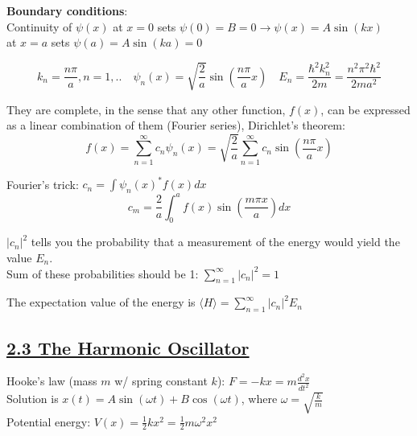 \textbf{Boundary conditions}: \\
Continuity of $\psi(x)$ at $x = 0$ sets $\psi(0) = B = 0 \rightarrow \psi(x) = A \sin(kx)$ \\
at $x = a$ sets $\psi(a) = A \sin(ka) = 0$

$$k_n = \frac{n \pi}{a}, n = 1,.. \quad \psi_n(x) = \sqrt{\frac{2}{a}} \sin(\frac{n \pi}{a} x) \quad E_n = \frac{\hbar^2 k_n^2}{2m} = \frac{n^2 \pi^2 \hbar^2}{2ma^2}$$




They are complete, in the sense that any other function, $f(x)$, can be expressed as a linear combination of them (Fourier series), Dirichlet's theorem:
    $$f(x) = \sum_{n=1}^{\infty} c_n \psi_n(x) = \sqrt{\frac{2}{a}} \sum_{n=1}^{\infty} c_n \sin(\frac{n \pi}{a} x)$$

Fourier's trick: $c_n = \int \psi_n(x)^* f(x) dx$ \\
$$c_m = \frac{2}{a} \int_0^a f(x) \sin(\frac{m \pi x}{a}) dx$$

$|c_n|^2$ tells you the probability that a measurement of the energy would yield the value $E_n$. \\

Sum of these probabilities should be 1: $\sum_{n=1}^{\infty} |c_n|^2 = 1$

The expectation value of the energy is $\langle H \rangle = \sum_{n=1}^{\infty} |c_n|^2 E_n$

\subsection{\underline{2.3 The Harmonic Oscillator}}
Hooke's law (mass $m$ w/ spring constant $k$): $F = -kx = m \frac{d^2 x}{d t^2}$ \\
Solution is $x(t) = A \sin(\omega t) + B \cos(\omega t)$, where $\omega = \sqrt{\frac{k}{m}}$ \\
Potential energy: $V(x) = \frac{1}{2} k x^2 = \frac{1}{2} m \omega^2 x^2$ \\

